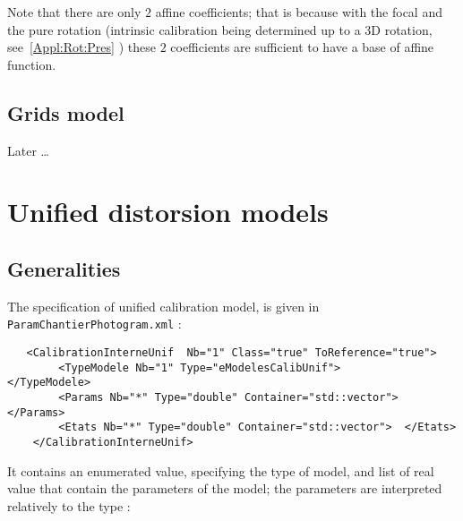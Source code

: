 Note that there are only $2$ affine coefficients; that is because with
the focal and the pure rotation (intrinsic calibration being determined up to
a 3D rotation, see~\ref{Appl:Rot:Pres} ) these $2$ coefficients are sufficient to have a
base of affine function.



\subsection{Grids model}

Later \dots




\section{Unified distorsion models}


\subsection{Generalities}

The specification of  unified calibration model, is given in
{\tt ParamChantierPhotogram.xml} :

\begin{verbatim}
   <CalibrationInterneUnif  Nb="1" Class="true" ToReference="true">
        <TypeModele Nb="1" Type="eModelesCalibUnif">          </TypeModele>
        <Params Nb="*" Type="double" Container="std::vector"> </Params>
        <Etats Nb="*" Type="double" Container="std::vector">  </Etats>
    </CalibrationInterneUnif>
\end{verbatim}

It contains an enumerated value, specifying the type of model, and
list of real value that contain the parameters of the model; the parameters
are interpreted relatively to the type :


